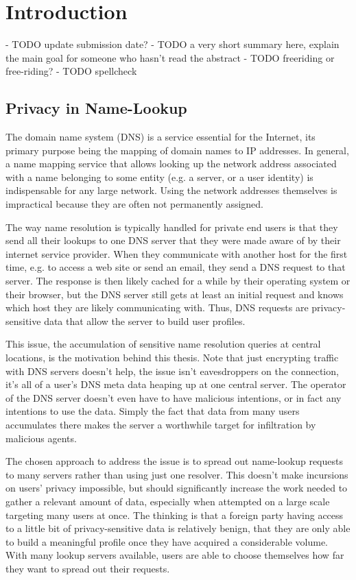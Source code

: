 \chapter{Introduction}
- TODO update submission date?
- TODO a very short summary here, explain the main goal for someone who hasn't
  read the abstract
- TODO freeriding or free-riding?
- TODO spellcheck

\section{Privacy in Name-Lookup}
The domain name system (DNS) is a service essential for the Internet, its
primary purpose being the mapping of domain names to IP addresses. In general, a
name mapping service that allows looking up the network address associated with
a name belonging to some entity (e.g. a server, or a user identity) is
indispensable for any large network. Using the network addresses themselves is
impractical because they are often not permanently assigned.

The way name resolution is typically handled for private end users is that they
send all their lookups to one DNS server that they were made aware of by their
internet service provider. When they communicate with another host for the first
time, e.g. to access a web site or send an email, they send a DNS request to
that server. The response is then likely cached for a while by their
operating system or their browser, but the DNS server still gets at least an
initial request and knows which host they are likely communicating with. Thus,
DNS requests are privacy-sensitive data that allow the server to build user
profiles.

This issue, the accumulation of sensitive name resolution queries at central
locations, is the motivation behind this thesis. Note that just encrypting
traffic with DNS servers doesn't help, the issue isn't eavesdroppers on the
connection, it's all of a user's DNS meta data heaping up at one central server.
The operator of the DNS server doesn't even have to have malicious intentions,
or in fact any intentions to use the data. Simply the fact that data from many
users accumulates there makes the server a worthwhile target for infiltration by
malicious agents.

The chosen approach to address the issue is to spread out name-lookup requests
to many servers rather than using just one resolver. This doesn't make
incursions on users' privacy impossible, but should significantly increase the
work needed to gather a relevant amount of data, especially when attempted on a
large scale targeting many users at once. The thinking is that a foreign party
having access to a little bit of privacy-sensitive data is relatively benign,
that they are only able to build a meaningful profile once they have acquired a
considerable volume. With many lookup servers available, users are able to
choose themselves how far they want to spread out their requests.

